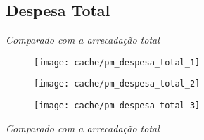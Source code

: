 
\subsection{Despesa Total}






\textit{Comparado com a arrecadação total}

\begin{figure}[H]
\center
\texttt{[image: cache/pm\_despesa\_total\_1]}
\end{figure}

\begin{figure}[H]
\center
\texttt{[image: cache/pm\_despesa\_total\_2]}
\end{figure}

\begin{figure}[H]
\center
\texttt{[image: cache/pm\_despesa\_total\_3]}
\end{figure}

\textit{Comparado com a arrecadação total}
